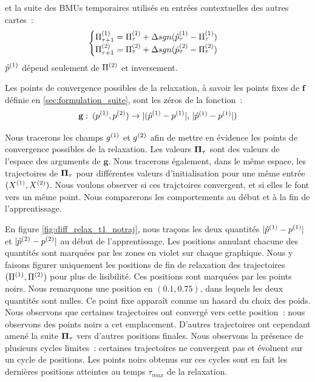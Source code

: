 \documentclass[../main]{subfiles}
\begin{document}
et la suite des BMUs temporaires utilisés en entrées contextuelles des autres cartes~:
\begin{equation*}
	\begin{cases}
	\Pi^{({1})}_{\tau+1} = \Pi^{({1})}_\tau + \Delta sgn(\hat{p}^{({1})}_\tau - \Pi^{({1})}_\tau)  \\
	\Pi^{({2})}_{\tau+1} = \Pi^{({2})}_\tau + \Delta sgn(\hat{p}^{({2})}_\tau - \Pi^{({2})}_\tau) \\
	\end{cases}
	\end{equation*}
$\hat{p}^{({1})}$ dépend seulement de $\Pi^{({2})}$ et inversement. 

Les points de convergence possibles de la relaxation, à savoir les points fixes de $\mathbf{f}$ définie en \ref{sec:formulation_suite}, sont les zéros de la fonction~:
\begin{equation} 
	\mathbf{g}:\: (p\m{1}, p\m{2}) \rightarrow \lvert (\hat{p}\m{1} - p\m{1} \rvert$,  $\lvert \hat{p}\m{1} - p\m{1} \rvert)
\end{equation}

Nous tracerons les champs $g^{({1})}$ et $g^{({2})}$ afin de mettre en évidence les points de convergence possibles de la relaxation. Les valeurs $\mathbf{\Pi}_\tau$ sont des valeurs de l'espace des arguments de $\mathbf{g}$. 
Nous tracerons également, dans le même espace, les trajectoires de  $\mathbf{\Pi}_\tau$ pour différentes valeurs d'initialisation pour une même entrée $(X^{({1})}, X^{({2})})$. Nous voulons observer si ces trajctoires convergent, et si elles le font vers un même point.
Nous comparerons les comportements au début et à la fin de l'apprentissage.

En figure \ref{fig:diff_relax_t1_notraj}, nous traçons les deux quantités $\lvert \hat{p}^{({1})} - p^{({1})} \rvert$ et $\lvert \hat{p}^{({2})} - p^{({2})}\rvert$ au début de l'apprentissage. 
Les positions annulant chacune des quantités sont marquées par les zones en violet sur chaque graphique.
Nous y faisons figurer uniquement les positions de fin de relaxation des trajectoires $(\Pi^{({1})},\Pi^{({2})})$ pour plus de lisibilité. Ces positions sont marquées par les points noirs.
Nous remarquons une position en $(0.1, 0.75)$, dans lequels les deux quantités sont nulles. Ce point fixe apparaît comme un hasard du choix des poids.
Nous observons que certaines trajectoires ont convergé vers cette position~: nous observons des points noirs a cet emplacement. D'autres trajectoires ont cependant amené la suite $\mathbf{\Pi}_\tau$ vers d'autres positions finales.
Nous observons la présence de plusieurs cycles limites~: certaines trajectoires ne convergent pas et évoluent sur un cycle de positions. 
Les points noirs obtenus sur ces cycles sont en fait les dernières positions atteintes au temps $\tau_{max}$ de la relaxation.
\end{document}
